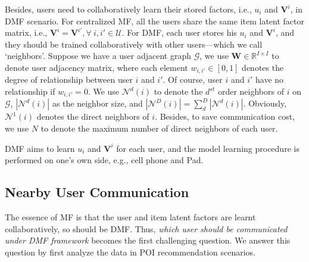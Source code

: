 Besides, users need to collaboratively learn their stored factors, i.e., $u_i$ and $\textbf{V}^i$, in DMF scenario. 
For centralized MF, all the users share the same item latent factor matrix, i.e., $\textbf{V}^i=\textbf{V}^{i'}, \forall ~ i,i' \in \mathcal{U}$. %
For DMF, each user stores his $u_i$ and $\textbf{V}^i$, and they should be trained collaboratively with other users---which we call `neighbors'. 
Suppose we have a user adjacent graph $\mathcal{G}$, we use $\textbf{W}\in \mathbb{R}^{I\times{}I}$ to denote user adjacency matrix, where each element $w_{i,i'} \in [0, 1]$ denotes the degree of relationship between user $i$ and $i'$. Of course, user $i$ and $i'$ have no relationship if $w_{i,i'}=0$. 
We use $\mathcal{N}^d(i)$ to denote the $d^{st}$ order neighbors of $i$ on $\mathcal{G}$, $|\mathcal{N}^d(i)|$ as the neighbor size, and $|\mathcal{N}^D(i)|=\sum\limits_{d}^D|\mathcal{N}^d(i)|$. %
Obviously, $\mathcal{N}^1(i)$ denotes the direct neighbors of $i$. %
Besides, to save communication cost, we use $N$ to denote the maximum number of direct neighbors of each user. 

DMF aims to learn $u_i$ and $\textbf{V}^i$ for each user, and the model learning procedure is performed on one's own side, e.g., cell phone and Pad.


\subsection{Nearby User Communication}
The essence of MF is that the user and item latent factors are learnt collaboratively, so should be DMF. 
Thus, \textit{which user should be communicated under DMF framework} becomes the first challenging question. 
We answer this question by first analyze the data in POI recommendation scenarios. 

